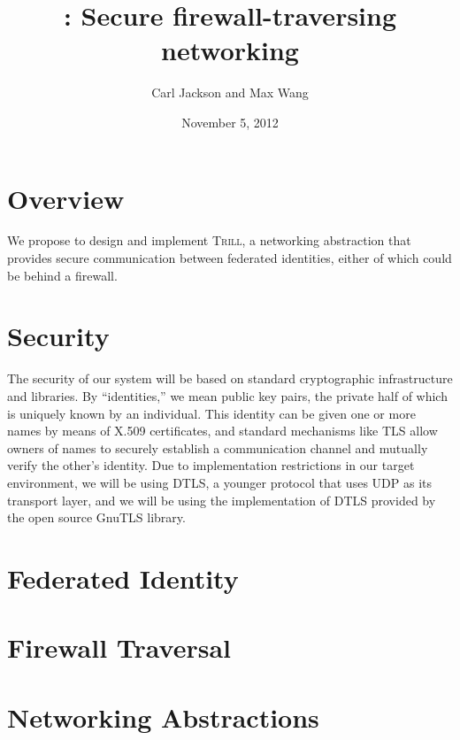 \documentclass[12pt]{article}
\title{\Trill: Secure firewall-traversing networking}
\author{Carl Jackson and Max Wang}
\date{November 5, 2012}
\makeatletter
\newcommand{\Trill}{\textsc{Trill}\xspace}
\renewcommand{\maketitle}{%
  \thispagestyle{plain}%
  \begin{center}%
    {\LARGE \@title \par}%
    {\large \@author \par}%
    {\large \@date \par}%
  \end{center}%
}
\makeatother
\begin{document}
\maketitle

\section*{Overview}
We propose to design and implement \Trill, a networking abstraction that
provides secure communication between federated identities, either of which
could be behind a firewall.

\section*{Security}
The security of our system will be based on standard cryptographic
infrastructure and libraries. By ``identities,'' we mean public key pairs, the
private half of which is uniquely known by an individual. This identity can be
given one or more names by means of X.509 certificates, and standard mechanisms
like TLS allow owners of names to securely establish a communication channel
and mutually verify the other's identity. Due to implementation restrictions in
our target environment, we will be using DTLS, a younger protocol that uses UDP
as its transport layer, and we will be using the implementation of DTLS
provided by the open source GnuTLS library.

\section*{Federated Identity}

\section*{Firewall Traversal}

\section*{Networking Abstractions}
\end{document}
